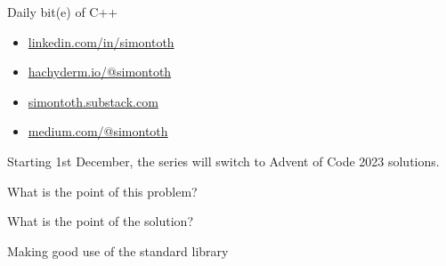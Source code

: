 \documentclass[aspectratio=169]{beamer}
\begin{document}
\begin{frame}{Daily bit(e) of C++}
  \begin{itemize}
    \item \href{https://www.linkedin.com/in/simontoth}{linkedin.com/in/simontoth}
    \item \href{https://hachyderm.io/@simontoth}{hachyderm.io/@simontoth}
    \item \href{https://simontoth.substack.com/}{simontoth.substack.com}
    \item \href{https://medium.com/@simontoth}{medium.com/@simontoth}
  \end{itemize}
  \vspace{1em}
  \pause Starting 1st December, the series will switch to Advent of Code 2023 solutions.
\end{frame}

\begin{frame}[c]
\begin{center}
  \huge What is the point of this problem?
\end{center}
\end{frame}

\begin{frame}[c]
\begin{center}
  \huge What is the point of the solution?
\end{center}
\end{frame}

\begin{frame}[c]
  \begin{center}
    \huge Making good use of the standard library
  \end{center}
\end{frame}
\end{document}
